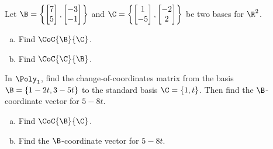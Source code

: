 \begin{exercise} %
	Let $\B=\left\{ \begin{bmatrix}7\\5\end{bmatrix},\begin{bmatrix}-3\\-1\end{bmatrix} \right\}$ and $\C=\left\{ \begin{bmatrix}1\\-5\end{bmatrix},\begin{bmatrix}-2\\2\end{bmatrix} \right\}$ be two bases for $\R^2$.
	\begin{multicols}{2}
		\begin{enumerate}[(a)]
			\item Find $\CoC{\B}{\C}$.
			\item Find $\CoC{\C}{\B}$.
		\end{enumerate}
	\end{multicols}
\end{exercise}
\vfill


\begin{exercise} %
	In $\Poly_1$, find the change-of-coordinates matrix from the basis $\B=\{ 1-2t , 3-5t \}$ to the standard basis $\C=\{1,t\}$. Then find the $\B$-coordinate vector for $5-8t$.
	\begin{multicols}{2}
		\begin{enumerate}[(a)]
			\item Find $\CoC{\B}{\C}$.
			\item Find the $\B$-coordinate vector for $5-8t$.
		\end{enumerate}
	\end{multicols}
\end{exercise}
\vfill




\newpage
